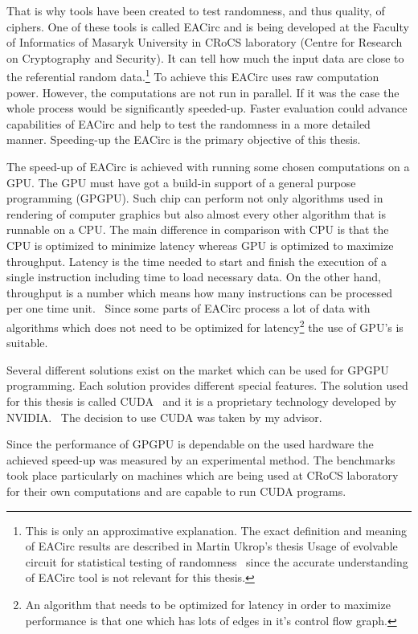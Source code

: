 \documentclass[12pt,oneside]{fithesis2}
\begin{document}
That is why tools have been created to test randomness, and thus quality, of ciphers. One of these tools is called EACirc and is being developed at the Faculty of Informatics of Masaryk University in CRoCS laboratory (Centre for Research on Cryptography and Security). It can tell how much the input data are close to the referential random data.\footnote{This is only an approximative explanation. The exact definition and meaning of EACirc results are described in Martin Ukrop's thesis Usage of evolvable circuit for statistical testing of randomness~\cite{ukrop_thesis} since the accurate understanding of EACirc tool is not relevant for this thesis.} To achieve this EACirc uses raw computation power. However, the computations are not run in parallel. If it was the case the whole process would be significantly speeded-up. Faster evaluation could advance capabilities of EACirc and help to test the randomness in a more detailed manner. Speeding-up the EACirc is the primary objective of this thesis.

The speed-up of EACirc is achieved with running some chosen computations on a GPU. The GPU must have got a build-in support of a general purpose programming (GPGPU). Such chip can perform not only algorithms used in rendering of computer graphics but also almost every other algorithm that is runnable on a CPU. The main difference in comparison with CPU is that the CPU is optimized to minimize latency whereas GPU is optimized to maximize throughput. Latency is the time needed to start and finish the execution of a single instruction including time to load necessary data. On the other hand, throughput\label{throughput} is a number which means how many instructions can be processed per one time unit.~\cite{professional_cuda} Since some parts of EACirc process a lot of data with algorithms which does not need to be optimized for latency\footnote{An algorithm that needs to be optimized for latency in order to maximize performance is that one which has lots of edges in it's control flow graph.} the use of GPU's is suitable.

Several different solutions exist on the market which can be used for GPGPU programming. Each solution provides different special features. The solution used for this thesis is called CUDA~\cite{about_cuda} and it is a proprietary technology developed by NVIDIA.~\cite{nvidia} The decision to use CUDA was taken by my advisor.

Since the performance of GPGPU is dependable on the used hardware the achieved speed-up was measured by an experimental method. The benchmarks took place particularly on machines which are being used at CRoCS laboratory for their own computations and are capable to run CUDA programs.
\end{document}
